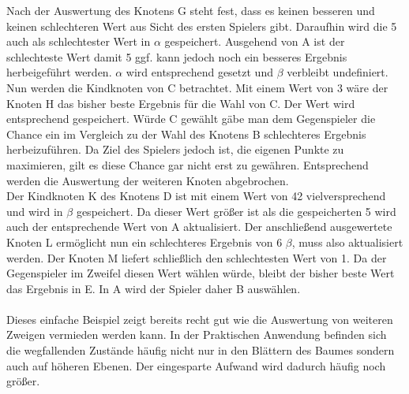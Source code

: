 Nach der Auswertung des Knotens G steht fest, dass es keinen besseren und keinen schlechteren Wert aus Sicht des ersten Spielers gibt. Daraufhin wird die 5 auch als schlechtester Wert in $\alpha$ gespeichert. Ausgehend von A  ist der schlechteste Wert damit 5 ggf. kann jedoch noch ein besseres Ergebnis herbeigeführt werden. $\alpha$ wird entsprechend gesetzt und $\beta$ verbleibt undefiniert.\\
Nun werden die Kindknoten von C betrachtet. Mit einem Wert von 3 wäre der Knoten H das bisher beste Ergebnis für die Wahl von C. Der Wert wird entsprechend gespeichert. Würde C gewählt gäbe man dem Gegenspieler die Chance ein im Vergleich zu der Wahl des Knotens B schlechteres Ergebnis herbeizuführen. Da Ziel des Spielers jedoch ist, die eigenen Punkte zu maximieren, gilt es diese Chance gar nicht erst zu gewähren. Entsprechend werden die Auswertung der weiteren Knoten abgebrochen.\\
Der Kindknoten K des Knotens D ist mit einem Wert von 42 vielversprechend und wird in $\beta$ gespeichert. Da dieser Wert größer ist als die gespeicherten 5 wird auch der entsprechende Wert von A aktualisiert. Der anschließend ausgewertete Knoten L ermöglicht nun ein schlechteres Ergebnis von 6 $\beta$, muss also aktualisiert werden. Der Knoten M liefert schließlich den schlechtesten Wert von 1. Da der Gegenspieler im Zweifel diesen Wert wählen würde, bleibt der bisher beste Wert das Ergebnis in E. In A wird der Spieler daher B auswählen.
\paragraph{}  
Dieses einfache Beispiel zeigt bereits recht gut wie die Auswertung von weiteren Zweigen vermieden werden kann. In der Praktischen Anwendung befinden sich die wegfallenden Zustände häufig nicht nur in den Blättern des Baumes sondern auch auf höheren Ebenen. Der eingesparte Aufwand wird dadurch häufig noch größer.  

